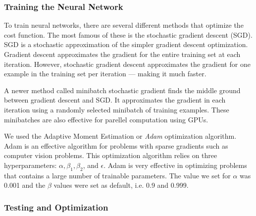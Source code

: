 \documentclass{article}
\begin{document}
  
  \subsubsection{Training the Neural Network}
  To train neural networks, there are several different methods that optimize 
  the cost function. The most famous of these is the stochastic gradient descent (SGD). 
  SGD is a stochastic approximation of the simpler gradient descent optimization. Gradient 
  descent approximates the gradient for the entire training set at each iteration. However, 
  stochastic gradient descent approximates the gradient for one example in the training set 
  per iteration --- making it much faster. 

  A newer method called minibatch stochastic gradient finds the middle ground between 
  gradient descent and SGD. It approximates the gradient in each iteration using a randomly 
  selected minibatch of training examples. These minibatches are also effective for 
  parellel computation using GPUs. 

  We used the Adaptive Moment Estimation or \textit{Adam} optimization algorithm. Adam is an 
  effective algorithm for problems with sparse gradients such as computer vision problems. 
  This optimization algorithm relies on three hyperparameters: $\alpha, \beta_1, \beta_2 $, and $\epsilon$.
  Adam is very effective in optimizing problems that contains a large number 
  of trainable parameters. The value we set for $\alpha$ was 0.001 and the $\beta$ values 
  were set as default, i.e. 0.9 and 0.999. 
     
   
  
  \subsubsection{Testing and Optimization}
\end{document}
